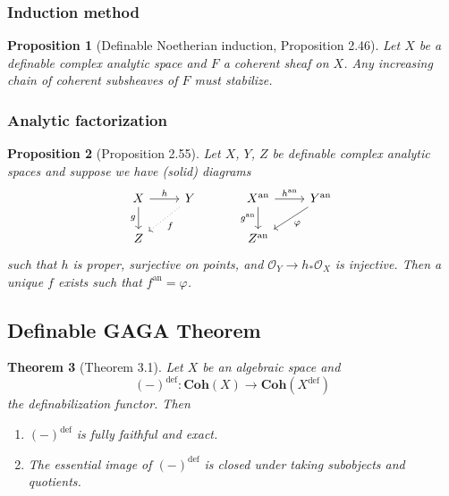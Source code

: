 \documentclass{amsart}
\newtheorem{theorem}{Theorem}[subsection]
\newtheorem{proposition}[theorem]{Proposition}
\theoremstyle{definition}
\numberwithin{equation}{section}
\newcommand{\definable}{\mathrm{def}}
\newcommand{\analytic}{\mathrm{an}}
\begin{document}
\subsubsection{Induction method}
\begin{proposition}[Definable Noetherian induction, Proposition 2.46]
  Let $X$ be a definable complex analytic space and $F$ a coherent sheaf on $X$. 
  Any increasing chain of coherent subsheaves of $F$ must stabilize.
\end{proposition}

\subsubsection{Analytic factorization}
\begin{proposition}[Proposition 2.55]
  Let $X$, $Y$, $Z$ be definable complex analytic spaces and
  suppose we have (solid) diagrams
  \[
    \begin{tikzcd}
      X \ar[r,"h"] \ar[d,"g"'] & Y\ar[dl,"f",dotted] \\ Z 
    \end{tikzcd}
    \hspace*{30pt}
    \begin{tikzcd}
      X^{\analytic} \ar[r,"h^{\analytic}"] \ar[d,"g^{\analytic}"'] & Y^{\analytic}\ar[dl,"\varphi"] \\ Z^{\analytic}
    \end{tikzcd}
  \]
  such that $h$ is proper, surjective on points,
  and $\mathcal{O}_Y \to h_*\mathcal{O}_X$ is injective.
  Then a unique $f$ exists such that $f^{\analytic} = \varphi$.
\end{proposition}

\subsection{Definable GAGA Theorem}
\hfill
\begin{tcolorbox}[title = {\Large Goal}]
  \begin{theorem}[Theorem 3.1]
    \label{def GAGA}
    Let $X$ be an algebraic space and
    \[(-)^{\definable} : \mathbf{Coh}(X) \to \mathbf{Coh}(X^{\definable})\]
    the definabilization functor.
    Then 
    \begin{enumerate}[label = {(\arabic*)}]
      \item $(-)^{\definable}$ is fully faithful and exact.
      \item The essential image of $(-)^{\definable}$ is closed under taking subobjects and quotients.
    \end{enumerate}
  \end{theorem}
\end{tcolorbox}
\end{document}
